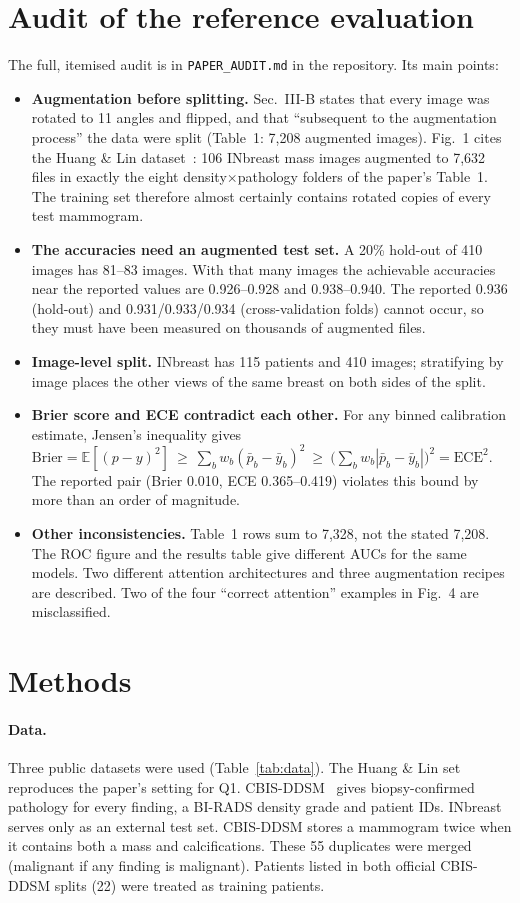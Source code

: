 \documentclass[10pt,a4paper]{article}
\begin{document}
\section{Audit of the reference evaluation}\label{sec:audit}
The full, itemised audit is in \texttt{PAPER\_AUDIT.md} in the repository. Its main points:
\begin{itemize}
\item \textbf{Augmentation before splitting.} Sec.~III-B states that every image was rotated to 11 angles and flipped,
and that ``subsequent to the augmentation process'' the data were split (Table~1: 7,208 augmented images). Fig.~1 cites
the Huang \& Lin dataset~\cite{huang2020}: 106 INbreast mass images augmented to 7,632 files in exactly the eight
density$\times$pathology folders of the paper's Table~1. The training set therefore almost certainly contains rotated
copies of every test mammogram.
\item \textbf{The accuracies need an augmented test set.} A 20\% hold-out of 410 images has 81--83 images. With
that many images the achievable accuracies near the reported values are 0.926--0.928 and 0.938--0.940. The reported
0.936 (hold-out) and 0.931/0.933/0.934 (cross-validation folds) cannot occur, so they must have been measured on
thousands of augmented files.
\item \textbf{Image-level split.} INbreast has 115 patients and 410 images; stratifying by image places the other views
of the same breast on both sides of the split.
\item \textbf{Brier score and ECE contradict each other.} For any binned calibration estimate, Jensen's inequality gives
$\mathrm{Brier}=\mathbb{E}[(p-y)^2]\ \ge\ \sum_b w_b(\bar p_b-\bar y_b)^2\ \ge\ \big(\sum_b w_b|\bar p_b-\bar y_b|\big)^2=\mathrm{ECE}^2$.
The reported pair (Brier 0.010, ECE 0.365--0.419) violates this bound by more than an order of magnitude.
\item \textbf{Other inconsistencies.} Table~1 rows sum to 7,328, not the stated 7,208. The ROC figure and the results
table give different AUCs for the same models. Two different attention architectures and three augmentation recipes
are described. Two of the four ``correct attention'' examples in Fig.~4 are misclassified.
\end{itemize}

\section{Methods}\label{sec:methods}
\paragraph{Data.} Three public datasets were used (Table~\ref{tab:data}). The Huang \& Lin set reproduces the paper's
setting for Q1. CBIS-DDSM~\cite{lee2017} gives biopsy-confirmed pathology for every finding, a BI-RADS density grade and
patient IDs. INbreast serves only as an external test set. CBIS-DDSM stores a mammogram twice when it contains both a
mass and calcifications. These 55 duplicates were merged (malignant if any finding is malignant). Patients listed in
both official CBIS-DDSM splits (22) were treated as training patients.
\end{document}
